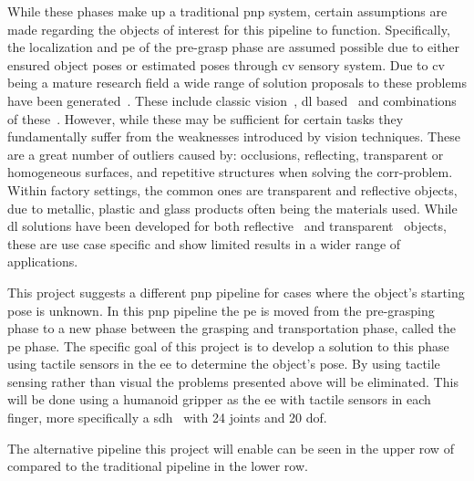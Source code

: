 While these phases make up a traditional \gls{pnp} system, certain assumptions are made regarding the objects of interest for this pipeline to function. Specifically, the localization and \gls{pe} of the pre-grasp phase are assumed possible due to either ensured object poses or estimated poses through \gls{cv} sensory system. Due to \gls{cv} being a mature research field a wide range of solution proposals to these problems have been generated~\cite{6d-pose-estimation-of-objects:-recent-technologies-and-challenges}. These include classic vision~\cite{3d-object-pose-estimation-using-stereo-vision-for-object-manipulation-system, stereo-vision-based-automation-for-a-bin-picking-solution}, \gls{dl} based~\cite{uncalibrated-stereo-vision-with-deep-learning-for-6-dof-pose-estimation-for-a-robot-arm-system} and combinations of these~\cite{stereo-vision-based-single-shot-6d-object-pose-estimation-for-bin-picking-by-a-robot-manipulator}. However, while these may be sufficient for certain tasks they fundamentally suffer from the weaknesses introduced by vision techniques. These are a great number of outliers caused by: occlusions, reflecting, transparent or homogeneous surfaces, and repetitive structures when solving the \gls{corr-problem}. Within factory settings, the common ones are transparent and reflective objects, due to metallic, plastic and glass products often being the materials used. While \gls{dl} solutions have been developed for both reflective~\cite{data-driven-object-pose-estimation-in-a-practical-bin-picking-application} and transparent~\cite{6dof-pose-estimation-of-transparent-object-from-a-single-rgb-d-image} objects, these are use case specific and show limited results in a wider range of applications. \medskip

This project suggests a different \gls{pnp} pipeline for cases where the object's starting pose is unknown. In this \gls{pnp} pipeline the \gls{pe} is moved from the pre-grasping phase to a new phase between the grasping and transportation phase, called the \gls{pe} phase. The specific goal of this project is to develop a solution to this phase using tactile sensors in the \gls{ee} to determine the object's pose. By using tactile sensing rather than visual the problems presented above will be eliminated. This will be done using a humanoid gripper as the \gls{ee} with tactile sensors in each finger, more specifically a \gls{sdh}~\cite{shadow-dex-hand} with \num{24} joints and \num{20} \gls{dof}. \medskip

The alternative pipeline this project will enable can be seen in the upper row of  compared to the traditional pipeline in the lower row.\medskip 

